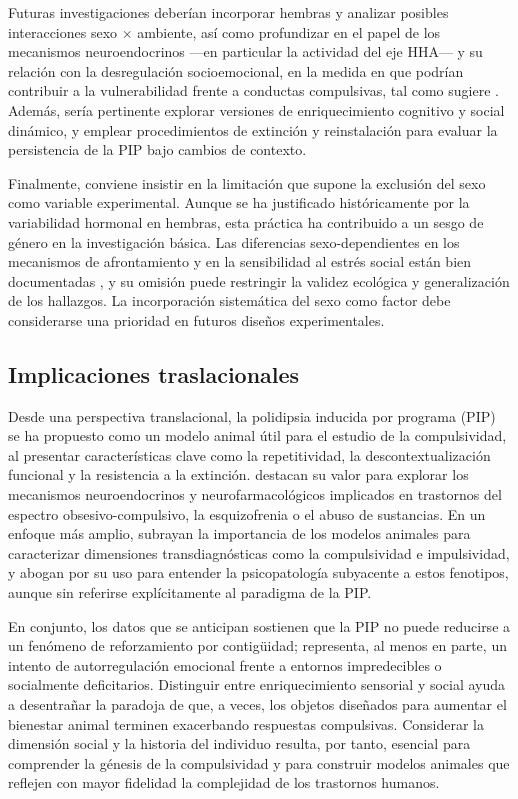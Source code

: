 \documentclass[12pt,a4paper]{article}
\begin{document}
\begin{multicols}{2}
Futuras investigaciones deberían incorporar hembras y analizar posibles interacciones sexo × ambiente, así como profundizar en el papel de los mecanismos neuroendocrinos —en particular la actividad del eje HHA— y su relación con la desregulación socioemocional, en la medida en que podrían contribuir a la vulnerabilidad frente a conductas compulsivas, tal como sugiere \citet{MartinGonzalez2022}. Además, sería pertinente explorar versiones de enriquecimiento cognitivo y social dinámico, y emplear procedimientos de extinción y reinstalación para evaluar la persistencia de la PIP bajo cambios de contexto.

Finalmente, conviene insistir en la limitación que supone la exclusión del sexo como variable experimental. Aunque se ha justificado históricamente por la variabilidad hormonal en hembras, esta práctica ha contribuido a un sesgo de género en la investigación básica. Las diferencias sexo-dependientes en los mecanismos de afrontamiento y en la sensibilidad al estrés social están bien documentadas \citep{Bowman2006, Barha2011}, y su omisión puede restringir la validez ecológica y generalización de los hallazgos. La incorporación sistemática del sexo como factor debe considerarse una prioridad en futuros diseños experimentales.


\subsection*{Implicaciones traslacionales}

Desde una perspectiva translacional, la polidipsia inducida por programa (PIP) se ha propuesto como un modelo animal útil para el estudio de la compulsividad, al presentar características clave como la repetitividad, la descontextualización funcional y la resistencia a la extinción. \citet{Moreno2012} destacan su valor para explorar los mecanismos neuroendocrinos y neurofarmacológicos implicados en trastornos del espectro obsesivo-compulsivo, la esquizofrenia o el abuso de sustancias. En un enfoque más amplio, \citet{Fineberg2010} subrayan la importancia de los modelos animales para caracterizar dimensiones transdiagnósticas como la compulsividad e impulsividad, y abogan por su uso para entender la psicopatología subyacente a estos fenotipos, aunque sin referirse explícitamente al paradigma de la PIP.

En conjunto, los datos que se anticipan sostienen que la PIP no puede reducirse a un fenómeno de reforzamiento por contigüidad; representa, al menos en parte, un intento de autorregulación emocional frente a entornos impredecibles o socialmente deficitarios. Distinguir entre enriquecimiento sensorial y social ayuda a desentrañar la paradoja de que, a veces, los objetos diseñados para aumentar el bienestar animal terminen exacerbando respuestas compulsivas. Considerar la dimensión social y la historia del individuo resulta, por tanto, esencial para comprender la génesis de la compulsividad y para construir modelos animales que reflejen con mayor fidelidad la complejidad de los trastornos humanos.




\end{multicols}
\end{document}
